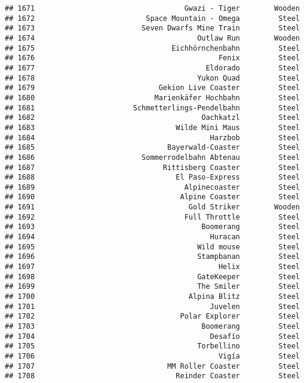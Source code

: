\documentclass[
]{article}
\begin{document}
\begin{verbatim}
## 1671                                   Gwazi - Tiger        Wooden
## 1672                          Space Mountain - Omega         Steel
## 1673                         Seven Dwarfs Mine Train         Steel
## 1674                                      Outlaw Run        Wooden
## 1675                                Eichhörnchenbahn         Steel
## 1676                                           Fenix         Steel
## 1677                                        Eldorado         Steel
## 1678                                      Yukon Quad         Steel
## 1679                             Gekion Live Coaster         Steel
## 1680                            Marienkäfer Hochbahn         Steel
## 1681                       Schmetterlings-Pendelbahn         Steel
## 1682                                       Oachkatzl         Steel
## 1683                                 Wilde Mini Maus         Steel
## 1684                                         Harzbob         Steel
## 1685                               Bayerwald-Coaster         Steel
## 1686                         Sommerrodelbahn Abtenau         Steel
## 1687                              Rittisberg Coaster         Steel
## 1688                                 El Paso-Express         Steel
## 1689                                   Alpinecoaster         Steel
## 1690                                  Alpine Coaster         Steel
## 1691                                    Gold Striker        Wooden
## 1692                                   Full Throttle         Steel
## 1693                                       Boomerang         Steel
## 1694                                         Huracan         Steel
## 1695                                      Wild mouse         Steel
## 1696                                      Stampbanan         Steel
## 1697                                           Helix         Steel
## 1698                                      GateKeeper         Steel
## 1699                                      The Smiler         Steel
## 1700                                    Alpina Blitz         Steel
## 1701                                         Juvelen         Steel
## 1702                                  Polar Explorer         Steel
## 1703                                       Boomerang         Steel
## 1704                                         Desafío         Steel
## 1705                                      Torbellino         Steel
## 1706                                           Vigía         Steel
## 1707                               MM Roller Coaster         Steel
## 1708                                 Reinder Coaster         Steel

\end{verbatim}
\end{document}
